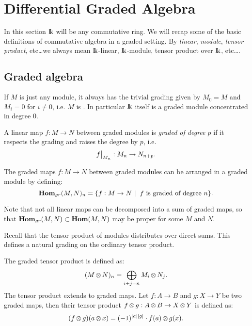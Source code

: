 
\chapter{Differential Graded Algebra}
\label{sec:algebra}

In this section $\mathrm{I\!k}$ will be any commutative ring. We will recap some of the basic definitions of commutative algebra in a graded setting. By \emph{linear}, \emph{module}, \emph{tensor product}, etc\dots we always mean $\mathrm{I\!k}$-linear, $\mathrm{I\!k}$-module, tensor product over $\mathrm{I\!k}$, etc\dots.

\section{Graded algebra}


If $M$ is just any module, it always has the trivial grading given by $M_0 = M$ and $M_i = 0$ for $i \neq 0$, i.e. $M$ is . In particular $\mathrm{I\!k}$ itself is a graded module concentrated in degree $0$.

\begin{definition}
	A linear map $f: M \to N$ between graded modules is \emph{graded of degree $p$} if it respects the grading and raises the degree by $p$, i.e.
	$$ \restr{f}{M_n} : M_n \to N_{n+p}. $$
\end{definition}

\begin{definition}
	The graded maps $f: M \to N$ between graded modules can be arranged in a graded module by defining:
	$$ \mathbf{Hom}_{gr}(M, N)_n = \{ f: M \to N \,\mid\, f \text{ is graded of degree } n \}. $$
\end{definition}

Note that not all linear maps can be decomposed into a sum of graded maps, so that $\mathbf{Hom}_{gr}(M, N) \subset \mathbf{Hom}(M, N)$ may be proper for some $M$ and $N$.

Recall that the tensor product of modules distributes over direct sums. This defines a natural grading on the ordinary tensor product.

\begin{definition}
	The graded tensor product is defined as:
	$$ (M \operatorname*{\otimes} N)_n = \bigoplus_{i + j = n} M_i \operatorname*{\otimes} N_j. $$
	The tensor product extends to graded maps. Let $f: A \to B$ and $g:X \to Y$ be two graded maps, then their tensor product $f \operatorname*{\otimes} g: A \operatorname*{\otimes} B \to X \operatorname*{\otimes} Y$ is defined as:
	$$ (f \operatorname*{\otimes} g)(a \operatorname*{\otimes} x) = (-1)^{{|{a}|}{|{g}|}} \cdot f(a) \operatorname*{\otimes} g(x). $$
\end{definition}

